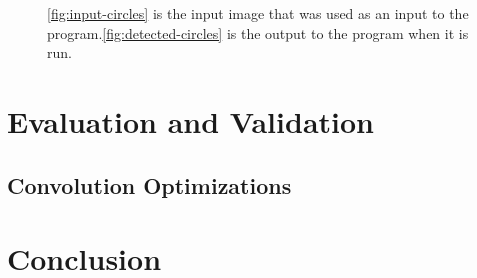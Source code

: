 \documentclass[conference]{IEEEtran}
\begin{document}
\begin{figure}%
  \centering
  \hfil
  \caption{\autoref{fig:input-circles} is the input image that was used as an input to the program.\autoref{fig:detected-circles} is the output to the program when it is run.}
\end{figure}






\section{Evaluation and Validation}
\subsection{Convolution Optimizations}



\section{Conclusion}





\end{document}
